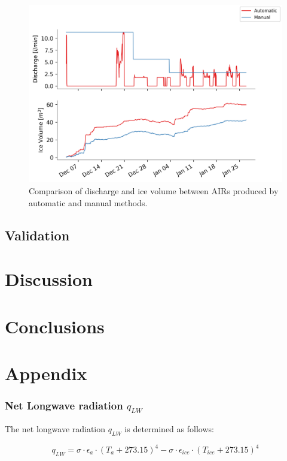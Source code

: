 \documentclass[utf8]{frontiersSCNS}
\begin{document}
\begin{figure}
	\begin{center}
		\includegraphics[width=\linewidth]{Figures/autovsmanual.png}
	\end{center}
	\caption{Comparison of discharge and ice volume between AIRs produced by automatic and manual methods. }
	\label{fig:old_icestupa}
\end{figure}

\subsection{Validation}

\section{Discussion}

\section{Conclusions}

\section{Appendix}

\subsubsection{Net Longwave radiation \texorpdfstring{$q_{LW}$}{Lg}} \label{sec:LW}
The net longwave radiation $q_{LW}$ is determined as follows:

\begin{equation}
	q_{LW}= \sigma \cdot \epsilon_a \cdot {(T_a+ 273.15)}^4 -\sigma \cdot \epsilon_{ice} \cdot {(T_{ice}+ 273.15)}^4
	\label{eqn:LW}
\end{equation}
\end{document}
